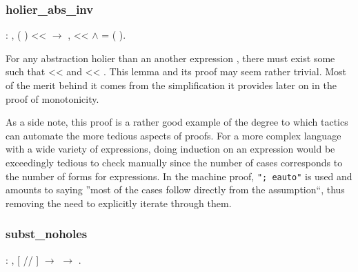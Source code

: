 \documentclass[12pt]{report}
\begin{document}
\subsubsection{holier\_abs\_inv}

\begin{coqdoccode}
\coqdocemptyline
\coqdocindent{1.00em}
  : \coqdockw{\ensuremath{\forall}}    ,\coqdoceol
\coqdocindent{2.00em}
(   ) <<  \ensuremath{\rightarrow}\coqdoceol
\coqdocindent{2.00em}
\coqdoctac{\ensuremath{\exists}} ,  <<  \ensuremath{\land}  = (   ).\coqdoceol
\coqdocemptyline
\end{coqdoccode}

For any abstraction   
 holier than an another expression ,
there must exist some  such that  <<
 and   
 <<   
. This lemma and its proof may seem rather trivial.
Most of the merit behind it comes from the simplification it provides
later on in the proof of monotonicity.


As a side note, this proof is a rather good example of the degree to
which tactics can automate the more tedious aspects of proofs. For
a more complex language with a wide variety of expressions, doing
induction on an expression would be exceedingly tedious to check
manually since the number of cases corresponds to the number of forms
for expressions. In the machine proof, \texttt{"; eauto"} is used and
amounts to saying ''most of the cases follow directly from the
assumption``, thus removing the need to explicitly iterate through
them. 

\subsubsection{subst\_noholes}

\begin{coqdoccode}
\coqdocemptyline
\coqdocindent{1.00em}
  : \coqdockw{\ensuremath{\forall}}    ,\coqdoceol
\coqdocindent{2.00em}
[  //  ]    \ensuremath{\rightarrow}\coqdoceol
\coqdocindent{2.00em}
  \ensuremath{\rightarrow}\coqdoceol
\coqdocindent{2.00em}
 .\coqdoceol
\coqdocemptyline
\end{coqdoccode}
\end{document}
